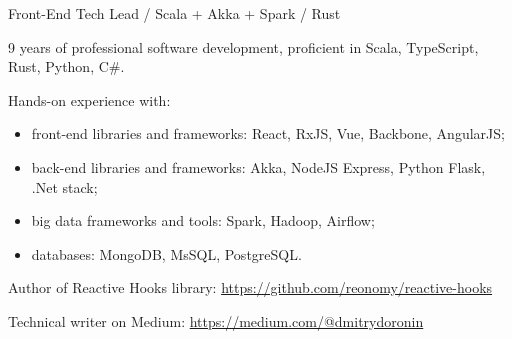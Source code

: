 \documentclass{resume}
\begin{document}

\begin{rSection}{Front-End Tech Lead / Scala + Akka + Spark / Rust}

9 years of professional software development, proficient in Scala, TypeScript, Rust, Python, C\#.

\item Hands-on experience with:
\begin{itemize}
    \item front-end libraries and frameworks: 
          React, RxJS, Vue, Backbone, AngularJS;
    \item back-end libraries and frameworks: 
          Akka, NodeJS Express, Python Flask, .Net stack;
    \item big data frameworks and tools:
          Spark, Hadoop, Airflow;
    \item databases:
          MongoDB, MsSQL, PostgreSQL.
\end{itemize}

\item Author of Reactive Hooks library: \url{https://github.com/reonomy/reactive-hooks}
\item Technical writer on Medium: \url{https://medium.com/@dmitrydoronin}

\end{rSection}

\end{document}
